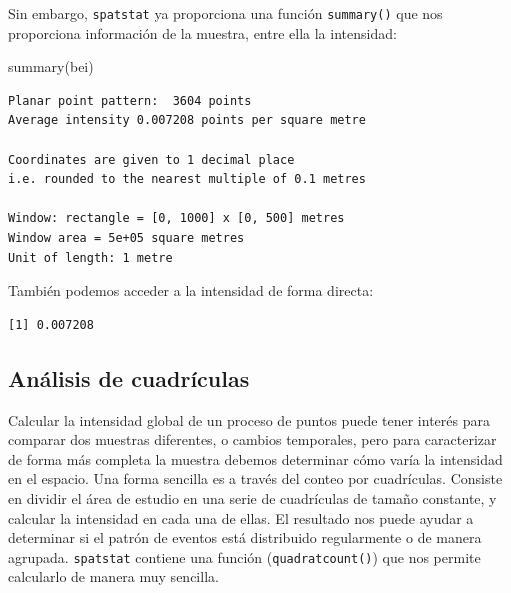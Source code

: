 \documentclass[
  letterpaper,
  DIV=11,
  numbers=noendperiod]{scrreprt}
\newenvironment{Shaded}{\begin{snugshade}}{\end{snugshade}}
\newcommand{\FunctionTok}[1]{\textcolor[rgb]{0.28,0.35,0.67}{#1}}
\newcommand{\NormalTok}[1]{\textcolor[rgb]{0.00,0.23,0.31}{#1}}
\newcommand{\SpecialCharTok}[1]{\textcolor[rgb]{0.37,0.37,0.37}{#1}}
\begin{document}
Sin embargo, \texttt{spatstat} ya proporciona una función
\texttt{summary()} que nos proporciona información de la muestra, entre
ella la intensidad:

\begin{Shaded}
\begin{Highlighting}[]
\FunctionTok{summary}\NormalTok{(bei)}
\end{Highlighting}
\end{Shaded}

\begin{verbatim}
Planar point pattern:  3604 points
Average intensity 0.007208 points per square metre

Coordinates are given to 1 decimal place
i.e. rounded to the nearest multiple of 0.1 metres

Window: rectangle = [0, 1000] x [0, 500] metres
Window area = 5e+05 square metres
Unit of length: 1 metre
\end{verbatim}

También podemos acceder a la intensidad de forma directa:

\begin{Shaded}
\end{Shaded}

\begin{verbatim}
[1] 0.007208
\end{verbatim}

\hypertarget{anuxe1lisis-de-cuadruxedculas}{%
\subsection{Análisis de
cuadrículas}\label{anuxe1lisis-de-cuadruxedculas}}

Calcular la intensidad global de un proceso de puntos puede tener
interés para comparar dos muestras diferentes, o cambios temporales,
pero para caracterizar de forma más completa la muestra debemos
determinar cómo varía la intensidad en el espacio. Una forma sencilla es
a través del conteo por cuadrículas. Consiste en dividir el área de
estudio en una serie de cuadrículas de tamaño constante, y calcular la
intensidad en cada una de ellas. El resultado nos puede ayudar a
determinar si el patrón de eventos está distribuido regularmente o de
manera agrupada. \texttt{spatstat} contiene una función
(\texttt{quadratcount()}) que nos permite calcularlo de manera muy
sencilla.
\end{document}
